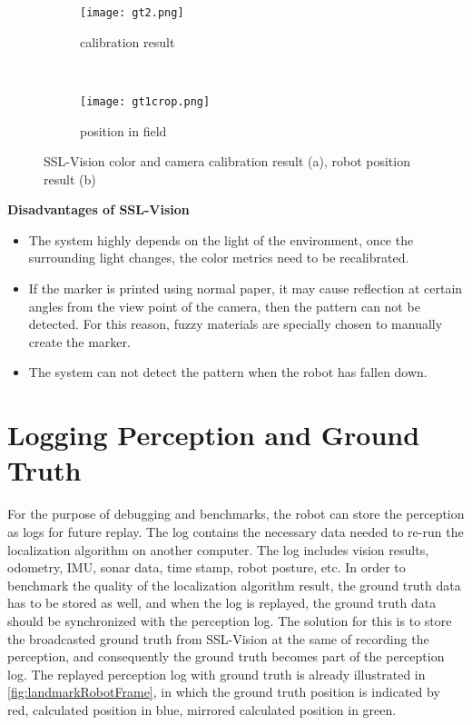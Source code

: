 \begin{figure}[h!]
        \centering
        \begin{subfigure}[h]{0.59\textwidth}
                \texttt{[image: gt2.png]}
                \caption{calibration result}
                \label{fig:calibration}
        \end{subfigure}%
        ~ %
        \begin{subfigure}[h]{0.41\textwidth}
                \texttt{[image: gt1crop.png]}
                \caption{position in field}
                \label{fig:position}
        \end{subfigure}%
	\caption[SSL-Vision color and camera calibration result, and robot position result]{SSL-Vision color and camera calibration result (a), robot position result (b)}
	\label{fig:sslVision result}
\end{figure}


\noindent\textbf{Disadvantages of SSL-Vision}
\begin{itemize}
  \item The system highly depends on the light of the environment, once the surrounding light changes, the color metrics need to be recalibrated. 
  \item If the marker is printed using normal paper, it may cause reflection at certain angles from the view point of the camera, then the pattern can not be detected. For this reason, fuzzy materials are specially chosen to manually create the marker. 
  \item The system can not detect the pattern when the robot has fallen down.
\end{itemize}

\section{Logging Perception and Ground Truth}
\label{sub:Logging Perception and Ground Truth}
For the purpose of debugging and benchmarks, the robot can store the perception as logs for future replay. The log contains the necessary data needed to re-run the localization algorithm on another computer. The log includes vision results, odometry, \gls{IMU}, sonar data, time stamp, robot posture, etc. In order to benchmark the quality of the localization algorithm result, the ground truth data has to be stored as well, and when the log is replayed, the ground truth data should be synchronized with the perception log. The solution for this is to store the broadcasted ground truth from SSL-Vision at the same of recording the perception, and consequently the ground truth becomes part of the perception log. The replayed perception log with ground truth is already illustrated in \autoref{fig:landmarkRobotFrame}, in which the ground truth position is indicated by red, calculated position in blue, mirrored calculated position in green.

